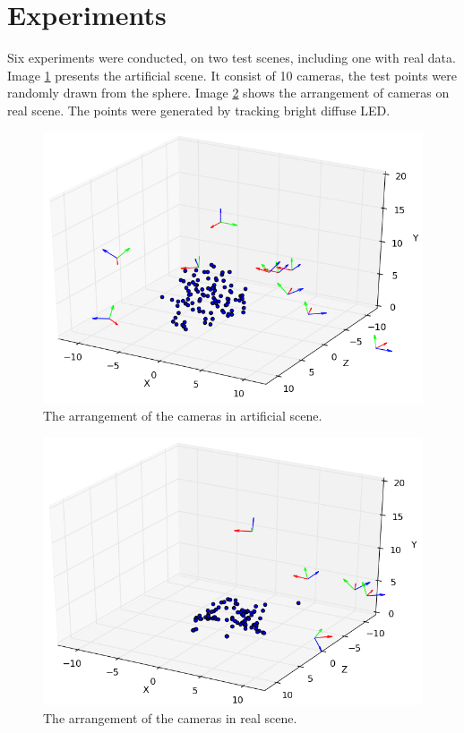 \documentclass[12pt]{article}
\begin{document}
\section{Experiments}

Six experiments were conducted, on two test scenes, including one with real data. Image \ref{fig:artificial} presents the artificial scene. It consist of 10 cameras, the test points were randomly drawn from the sphere. Image \ref{fig:real} shows the arrangement of cameras on real scene. The points were generated by tracking bright diffuse LED.

\begin{figure}[ht]
\centering
\includegraphics[scale=0.5]{artificial.png}
\caption{The arrangement of the cameras in artificial scene.}
\label{fig:artificial}
\end{figure}

\begin{figure}[ht]
\centering
\includegraphics[scale=0.5]{real.png}
\caption{The arrangement of the cameras in real scene.}
\label{fig:real}
\end{figure}
\end{document}
